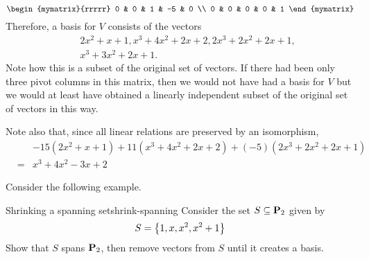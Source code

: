 \begin{solution}
\begin{equation*}
\begin{mymatrix}{rrrrr}
0 & 0 & 1 & -5 & 0 \\
0 & 0 & 0 & 0 & 1
\end{mymatrix}
\end{equation*}
Therefore, a basis for $V$ consists of the vectors
\begin{eqnarray*}
&&2x^{2}+x+1,x^{3}+4x^{2}+2x+2,2x^{3}+2x^{2}+2x+1, \\
&&x^{3}+3x^{2}+2x+1.
\end{eqnarray*}
Note how this is a subset of the original set of vectors. If there had been
only three pivot columns in this matrix, then we would not have had a basis
for $V$ but we would at least have obtained a linearly independent subset of
the original set of vectors in this way.

Note also that, since all linear relations are preserved by an isomorphism,
\begin{eqnarray*}
&&-15(2x^{2}+x+1) +11(x^{3}+4x^{2}+2x+2) +(
-5) (2x^{3}+2x^{2}+2x+1) \\
&=&x^{3}+4x^{2}-3x+2
\end{eqnarray*}

\end{solution}

Consider the following example.

\begin{example}{Shrinking a spanning set}{shrink-spanning}
Consider the set $S \subseteq \mathbf{P}_2$ given by
\[
S = \left\{1, x, x^2, x^2 + 1 \right\}
\]
Show that $S$ spans $\mathbf{P}_2$, then remove vectors from $S$ until it creates a basis.
\end{example}

